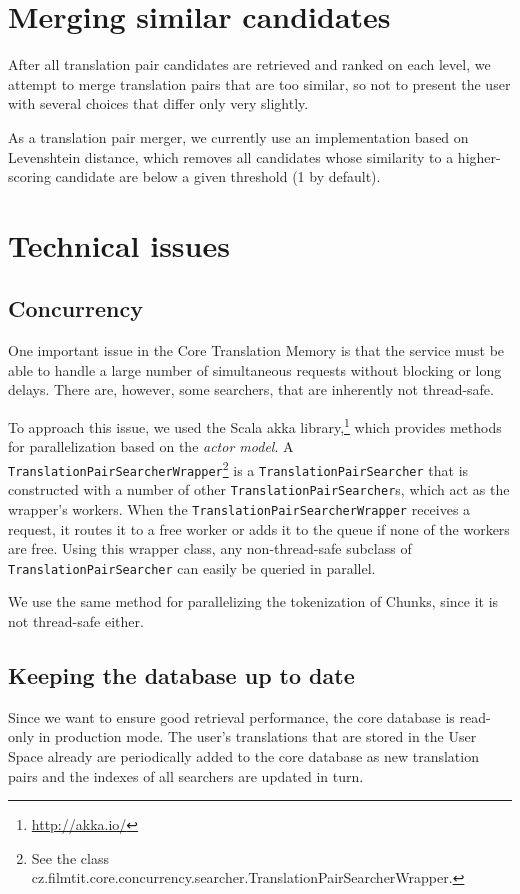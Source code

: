 \section{Merging similar candidates}

After all translation pair candidates are retrieved and ranked on each level, we attempt to merge translation pairs that are too similar, so not to present the user with several choices that differ only very slightly.

As a translation pair merger, we currently use an implementation based on Levenshtein distance, which removes all candidates whose similarity to a higher-scoring candidate are below a given threshold (1 by default).




\section{Technical issues}

\subsection{Concurrency}

One important issue in the Core Translation Memory is that the service must be able to handle a large number of simultaneous requests without blocking or long delays. There are, however, some searchers, that are inherently not thread-safe.

To approach this issue, we used the Scala akka library,\footnote{\url{http://akka.io/}} which provides methods for parallelization based on the \emph{actor model}. A {\tt TranslationPairSearcherWrapper}\footnote{See  the class cz.filmtit.core.concurrency.searcher.TranslationPairSearcherWrapper.} is a {\tt TranslationPairSearcher} that is constructed with a number of other {\tt TranslationPairSearcher}s, which act as the wrapper's workers. When the {\tt TranslationPairSearcherWrapper} receives a request, it routes it to a free worker or adds it to the queue if none of the workers are free. Using this wrapper class, any non-thread-safe subclass of {\tt TranslationPairSearcher} can easily be queried in parallel.

We use the same method for parallelizing the tokenization of Chunks, since it is not thread-safe either.


\subsection{Keeping the database up to date}

Since we want to ensure good retrieval performance, the core database is read-only in production mode. The user's translations that are stored in the User Space already are periodically added to the core database as new translation pairs and the indexes of all searchers are updated in turn.



